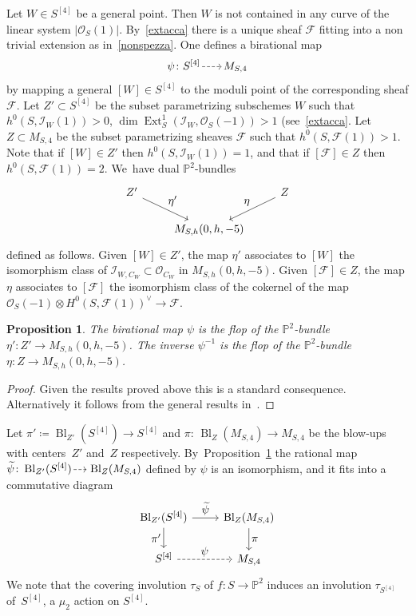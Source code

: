\documentclass[JEP,XML,SOM,Unicode,published]{cedram}
\let\ts\textstyle
\newcommand{\dradpl}{{\hspace*{-2.5mm}\begin{tikzcd}[ampersand replacement=\&,column sep = scriptsize]\mbox{}\ar[r,dashed]\&\mbox{}\end{tikzcd}\hspace*{-2.5mm}}}
\newcommand{\dratst}{{\hspace*{-2.5mm}\begin{tikzcd}[ampersand replacement=\&,column sep = small]\mbox{}\ar[r,dashed]\&\mbox{}\end{tikzcd}\hspace*{-2.5mm}}}
\let\drascst\dratst
\newcommand{\dra}{\mathchoice{\dradpl}{\dratst}{\drascst}{\drascst}}
\newcommand{\PP}{{\mathbb P}}\let\P\PP
\newcommand\cF{\mathcal{F}}
\newcommand\cI{\mathcal{I}}
\newcommand\cO{\mathcal{O}}
\DeclareMathOperator{\Bl}{Bl}
\DeclareMathOperator{\Ext}{Ext}
\let\wt\widetilde
\newtheorem{prop}[lemm]{Proposition}
\theoremstyle{definition}
\begin{document}
Let $W\in S^{[4]}$ be a general point. Then $W$ is not contained in any curve of the linear system $|\cO_S(1)|$. By~\eqref{extacca} there is a unique sheaf $\cF$ fitting into a non trivial extension as in~\eqref{nonspezza}.
One defines a birational map
\begin{equation}\label{modbir}
\psi\colon S^{[4]} \dra M_{S,4}
\end{equation}
by mapping a general $[W]\in S^{[4]}$ to the moduli point of the corresponding sheaf $\cF$.
Let $Z'\subset S^{[4]}$ be the subset parametrizing subschemes $W$ such that $h^0(S,\cI_W(1))>0$, \ie $\dim\Ext^1_S(\cI_W,\cO_S(-1))>1$ (see~\eqref{extacca}.
Let $Z\subset M_{S,4}$ be the subset parametrizing sheaves $\cF$ such that $h^0(S,\cF(1))>1$.
Note that if $[W]\in Z'$ then $h^0(S,\cI_W(1))=1$, and that if $[\cF]\in Z$ then $h^0(S,\cF(1))=2$. We~have dual $\PP^2$-bundles
\begin{equation}\label{fibratopiani}
\begin{tikzcd}
Z'\arrow[rd,"\ts\eta'"]&& Z \arrow[ld,"\ts\eta"']\\
& M_{S,h}(0,h,-5)&
\end{tikzcd}
\end{equation}
defined as follows. Given $[W]\in Z'$, the map $\eta'$ associates to $[W]$ the isomorphism class of $\cI_{W,C_W}\subset\cO_{C_W}$ in
$M_{S,h}(0,h,-5)$. Given $[\cF]\in Z$, the map $\eta$ associates to $[\cF]$ the isomorphism class of the cokernel of the map $\cO_S(-1)\otimes H^0(S,\cF(1))^{\vee}\to\cF$.

\begin{prop}\label{prop:ioflop}
The birational map $\psi$ is the flop of the $\PP^2$-bundle $\eta'\colon Z'\to M_{S,h}(0,h,-5)$. The inverse $\psi^{-1}$ is the flop of the $\PP^2$-bundle $\eta\colon Z\to M_{S,h}(0,h,-5)$.
\end{prop}

\begin{proof}
Given the results proved above this is a standard consequence. Alternatively it follows from the general results in~\cite[\S 9]{BM:walls}.
\end{proof}

Let $\pi'\!\coloneqq\!\Bl_{Z'}(S^{[4]})\!\to\! S^{[4]}$ and $\pi{:}\, \Bl_Z(M_{S,4})\!\to\! M_{S,4}$ be the blow-ups with \hbox{centers~$Z'$} and~$Z$ respectively. By~Proposition~\ref{prop:ioflop} the rational map
$\wt{\psi}\colon \Bl_{Z'}(S^{[4]})\dra\Bl_Z(M_{S,4})$ defined by $\psi$ is an isomorphism, and it fits into a commutative diagram
\begin{equation}\label{scoppiocontraggo}
\begin{tikzcd}
\Bl_{Z'}(S^{[4]}) \arrow[r,"\ts\wt{\psi}"] \arrow[d,"\ts\pi'"'] & \Bl_Z(M_{S,4})\arrow[d, "\ts\pi"]\\
S^{[4]}\arrow[r,dashed,"\ts\psi"]& M_{S,4}
\end{tikzcd}
\end{equation}
We note that the covering involution $\tau_S$ of $f\colon S\to\PP^2$ induces an involution $\tau_{S^{[4]}}$ of~$S^{[4]}$, \ie a $\mu_2$ action on $S^{[4]}$.
\end{document}
